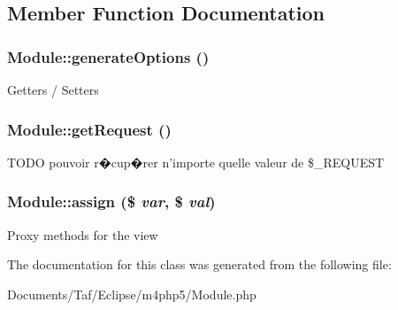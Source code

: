 \subsection{Member Function Documentation}
\hypertarget{classModule_fdadc52d1e8bf2ec2e5aa1eb679ddd9a}{
\subsubsection[generateOptions]{\setlength{\rightskip}{0pt plus 5cm}Module::generateOptions ()}}
\label{classModule_fdadc52d1e8bf2ec2e5aa1eb679ddd9a}


Getters / Setters \hypertarget{classModule_b49e9e05ec35dcb3182fb9941f0af9f8}{
\subsubsection[getRequest]{\setlength{\rightskip}{0pt plus 5cm}Module::getRequest ()}}
\label{classModule_b49e9e05ec35dcb3182fb9941f0af9f8}


TODO pouvoir r�cup�rer n'importe quelle valeur de \$\_\-REQUEST \hypertarget{classModule_89f3dd2fa37e8da929b595d22dadf05d}{
\subsubsection[assign]{\setlength{\rightskip}{0pt plus 5cm}Module::assign (\$ {\em var}, \/  \$ {\em val})}}
\label{classModule_89f3dd2fa37e8da929b595d22dadf05d}


Proxy methods for the view 

The documentation for this class was generated from the following file:\begin{CompactItemize}
\item 
Documents/Taf/Eclipse/m4php5/Module.php\end{CompactItemize}
